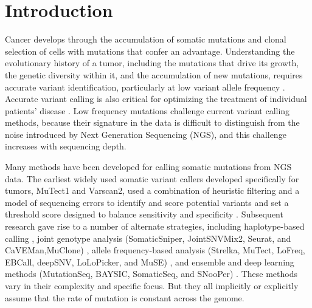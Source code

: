 \documentclass[a4,center,fleqn]{NAR}
\begin{document}
\section{Introduction}

Cancer develops through the accumulation of somatic mutations and clonal selection of cells with mutations that confer an advantage.
Understanding the evolutionary history of a tumor, including the mutations that drive its growth, the genetic diversity within it, and the accumulation of new mutations, requires accurate variant identification, particularly at low variant allele frequency \cite{Williams2016,Bozic2016,Williams2018,Shi2018}.
Accurate variant calling is also critical for optimizing the treatment of individual patients' disease \citep{Ding2012,Mardis2012,Chen2013,Borad2014,Findlay2016}.
Low frequency mutations challenge current variant calling methods, because their signature in the data is difficult to distinguish from the noise introduced by Next Generation Sequencing (NGS), and this challenge increases with sequencing depth.

Many methods have been developed for calling somatic mutations from NGS data.
The earliest widely used somatic variant callers developed specifically for tumors, MuTect1 and Varscan2, used a combination of heuristic filtering and a model of sequencing errors to identify and score potential variants and set a threshold score designed to balance sensitivity and specificity \citep{Koboldt2012,Cibulskis2013}.
Subsequent research gave rise to a number of alternate strategies, including haplotype-based calling \citep{Garrison2012},
joint genotype analysis (SomaticSniper, JointSNVMix2, Seurat, and CaVEMan,MuClone) \cite{Larson2012,Roth2012a,Christoforides2013,Jones2016,Dorri2019}, allele frequency-based analysis (Strelka, MuTect, LoFreq, EBCall, deepSNV, LoLoPicker, and MuSE) \citep{Saunders2012,Wilm2012,Shiraishi2013b,Gerstung2012,Carrot-Zhang2017,Fan2016}, and ensemble and deep learning methods (MutationSeq, BAYSIC, SomaticSeq, and SNooPer) \citep{Ding2012,Cantarel2014,Fang2015,Spinella2016}.
These methods vary in their complexity and specific focus.
But they all implicitly or explicitly assume that the rate of mutation is constant across the genome.
\end{document}
